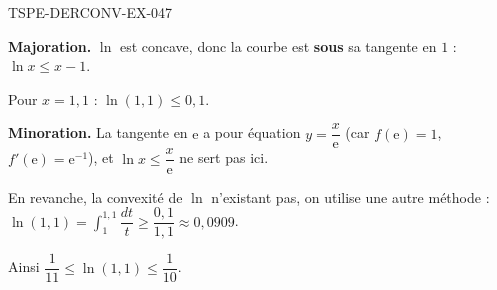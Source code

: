 \begin{corrige}{TSPE-DERCONV-EX-047}

\textbf{Majoration.} $\ln$ est concave, donc la courbe est \textbf{sous} sa tangente en $1$ : $\ln x \leq x - 1$.


Pour $x = 1{,}1$ : $\ln(1{,}1) \leq 0{,}1$.

\textbf{Minoration.} La tangente en $\mathrm{e}$ a pour équation $y = \dfrac{x}{\mathrm{e}}$ (car $f(\mathrm{e})=1$, $f'(\mathrm{e})=\mathrm{e}^{-1}$), et $\ln x \leq \dfrac{x}{\mathrm{e}}$ ne sert pas ici.

En revanche, la convexité de $\ln$ n'existant pas, on utilise une autre méthode : $\ln(1{,}1) = \int_1^{1{,}1} \dfrac{dt}{t} \geq \dfrac{0{,}1}{1{,}1} \approx 0{,}0909$.

Ainsi $\dfrac{1}{11} \leq \ln(1{,}1) \leq \dfrac{1}{10}$.

\end{corrige}
